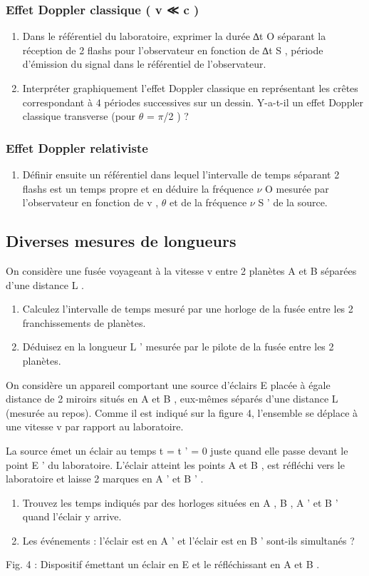 \subsubsection{Effet Doppler classique ( v ≪ c )}
\begin{enumerate}
  \item Dans le référentiel du laboratoire, exprimer la durée ∆t O séparant la réception de 2 flashs
pour l'observateur en fonction de ∆t S , période d'émission du signal dans le référentiel de
l'observateur.
  \item Interpréter graphiquement l'effet Doppler classique en représentant les crêtes correspondant
à 4 périodes successives sur un dessin. Y-a-t-il un effet Doppler classique transverse (pour
$\theta$ = $\pi$/2 ) ?
\setcounter{numero}{\theenumi}\end{enumerate}
\subsubsection{Effet Doppler relativiste}
\begin{enumerate}
  \setcounter{enumi}{\thenumero}
  \item Définir ensuite un référentiel dans lequel l'intervalle de temps séparant 2 flashs est un temps
propre et en déduire la fréquence $\nu$ O mesurée par l'observateur en fonction de v , $\theta$ et de la
fréquence $\nu$ S ' de la source.
\end{enumerate} 
\subsection{Diverses mesures de longueurs}
On considère une fusée voyageant à la vitesse v entre 2 planètes A et B séparées d'une distance L .
\begin{enumerate}
  \item Calculez l'intervalle de temps mesuré par une horloge de la fusée entre les 2 franchissements
de planètes.
  \item Déduisez en la longueur L ' mesurée par le pilote de la fusée entre les 2 planètes.
\setcounter{numero}{\theenumi}\end{enumerate}
On considère un appareil comportant une source d'éclairs E placée à égale distance de 2 miroirs
situés en A et B , eux-mêmes séparés d'une distance L (mesurée au repos). Comme il est indiqué
sur la figure 4, l'ensemble se déplace à une vitesse v par rapport au laboratoire.

La source émet un éclair au temps t = t ' = 0 juste quand elle passe devant le point E ' du
laboratoire. L'éclair atteint les points A et B , est réfléchi vers le laboratoire et laisse 2 marques
en A ' et B ' .
\begin{enumerate}
  \setcounter{enumi}{\thenumero}
  \item Trouvez les temps indiqués par des horloges situées en A , B , A ' et B ' quand l'éclair y arrive.
  \item Les événements : l'éclair est en A ' et l'éclair est en B ' sont-ils simultanés ?
\end{enumerate} 
Fig. 4 : Dispositif émettant un éclair en E et le réfléchissant en A et B .
